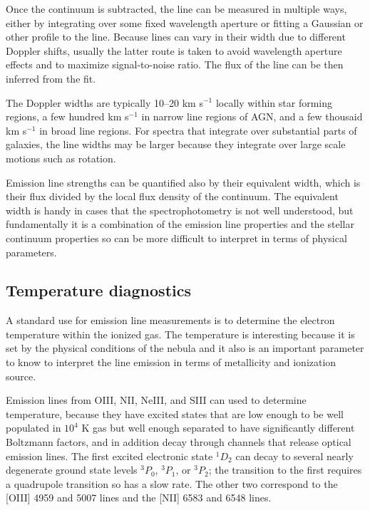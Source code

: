 Once the continuum is subtracted, the line can be measured in multiple
ways, either by integrating over some fixed wavelength aperture or
fitting a Gaussian or other profile to the line. Because lines can
vary in their width due to different Doppler shifts, usually the
latter route is taken to avoid wavelength aperture effects and to
maximize signal-to-noise ratio. The flux of the line can be then
inferred from the fit.

The Doppler widths are typically 10--20 km s$^{-1}$ locally within
star forming regions, a few hundred km s$^{-1}$ in narrow line regions
of AGN, and a few thousaid km s$^{-1}$ in broad line regions. For
spectra that integrate over substantial parts of galaxies, the line
widths may be larger because they integrate over large scale motions
such as rotation.

Emission line strengths can be quantified also by their equivalent
width, which is their flux divided by the local flux density of the
continuum. The equivalent width is handy in cases that the
spectrophotometry is not well understood, but fundamentally it is a
combination of the emission line properties and the stellar continuum
properties so can be more difficult to interpret in terms of physical
parameters.

\subsection{Temperature diagnostics}

A standard use for emission line measurements is to determine the
electron temperature within the ionized gas. The temperature is
interesting because it is set by the physical conditions of the nebula
and it also is an important parameter to know to interpret the line
emission in terms of metallicity and ionization source.

Emission lines from OIII, NII, NeIII, and SIII can used to determine
temperature, because they have excited states that are low enough to
be well populated in $10^4$ K gas but well enough separated to have
significantly different Boltzmann factors, and in addition decay
through channels that release optical emission lines. The first
excited electronic state ${}^{1}D_2$ can decay to several nearly
degenerate ground state levels ${}^3P_0$, ${}^3P_1$, or ${}^3P_2$; the
transition to the first requires a quadrupole transition so has a slow
rate. The other two correspond to the [OIII] 4959 and 5007 lines and
the [NII] 6583 and 6548 lines.

